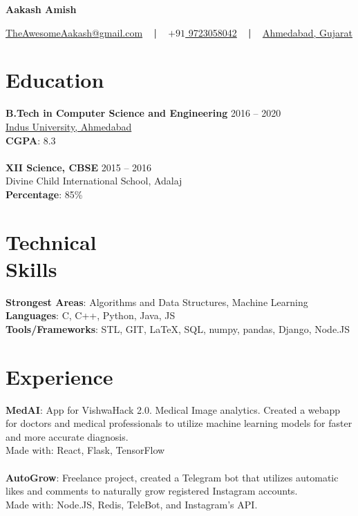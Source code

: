 \documentclass[margin, centered]{res}
\begin{document}
	\begin{center}
		\hspace{-\hoffset}
		\huge\bf{Aakash Amish}
	\end{center}
	\begin{center}
		\hspace{-\hoffset}
		\href{mailto:theawesomeaakash@gmail.com}{TheAwesomeAakash@gmail.com}
		~ \textbf{|} ~
		\href{tel:+919723058042}{\(+91\) 9723058042}
		~ \textbf{|} ~
		\href{https://goo.gl/maps/QqRrJzxewF82}{Ahmedabad, Gujarat}
	\end{center}

	\begin{resume}
		\section{Education}
			\textbf{B.Tech in Computer Science and Engineering} \hfill 2016 – 2020 \\
			\href{https://www.indusuni.ac.in/}{Indus University, Ahmedabad}\\
			\textbf{CGPA}: 8.3 \\ 
			\\
			\textbf{XII Science, CBSE} \hfill 2015 – 2016 \\
			Divine Child International School, Adalaj \\
			\textbf{Percentage}: 85\%
		
		\section{Technical \\ Skills}
			\textbf{Strongest Areas}: Algorithms and Data Structures, Machine Learning\\
			\textbf{Languages}: C, C++, Python, Java, JS\\
			\textbf{Tools/Frameworks}: STL, GIT, \LaTeX, SQL, numpy, pandas, Django, Node.JS
		
		\section{Experience}
			\textbf{MedAI}:
			App for VishwaHack 2.0. Medical Image analytics. Created a webapp for doctors and medical professionals to utilize machine learning models for faster and more accurate diagnosis.\\
			Made with: React, Flask, TensorFlow
			\\ \\
			\textbf{AutoGrow}:
			Freelance project, created a Telegram bot that utilizes automatic likes and comments to naturally grow registered Instagram accounts.\\
			Made with: Node.JS, Redis, TeleBot, and Instagram's API.
		

\end{resume}
\end{document}
